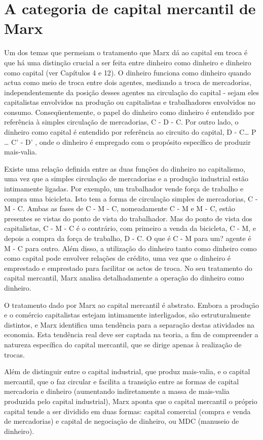 \section{A categoria de capital mercantil de Marx}
 \par 
Um dos temas que permeiam o tratamento que Marx dá ao capital em troca é que há uma distinção crucial a ser feita entre dinheiro como dinheiro e dinheiro como capital (ver Capítulos {\color{blue}4} e {\color{blue}12}). O dinheiro funciona como dinheiro quando actua como meio de troca entre dois agentes, mediando a troca de mercadorias, independentemente da posição desses agentes na circulação do capital - sejam eles capitalistas envolvidos na produção ou capitalistas e trabalhadores envolvidos no consumo. Conseqüentemente, o papel do dinheiro como dinheiro é entendido por referência à simples circulação de mercadorias, C - D - C. Por outro lado, o dinheiro como capital é entendido por referência ao circuito do capital, D - C… P … C' - D' , onde o dinheiro é empregado com o propósito específico de produzir mais-valia.
 \par 
Existe uma relação definida entre as duas funções do dinheiro no capitalismo, uma vez que a simples circulação de mercadorias e a produção industrial estão intimamente ligadas. Por exemplo, um trabalhador vende força de trabalho e compra uma bicicleta. Isto tem a forma de circulação simples de mercadorias, C - M - C. Ambas as fases de C - M - C, nomeadamente C - M e M - C, estão presentes se vistas do ponto de vista do trabalhador. Mas do ponto de vista dos capitalistas, C - M - C é o contrário, com primeiro a venda da bicicleta, C - M, e depois a compra da força de trabalho, D - C. O que é C - M para um? agente é M - C para outro. Além disso, a utilização do dinheiro tanto como dinheiro como como capital pode envolver relações de crédito, uma vez que o dinheiro é emprestado e emprestado para facilitar os actos de troca. No seu tratamento do capital mercantil, Marx analisa detalhadamente a operação do dinheiro como dinheiro.
 \par 
O tratamento dado por Marx ao capital mercantil é abstrato. Embora a produção e o comércio capitalistas estejam intimamente interligados, são estruturalmente distintos, e Marx identifica uma tendência para a separação destas atividades na economia. Esta tendência real deve ser captada na teoria, a fim de compreender a natureza específica do capital mercantil, que se dirige apenas à realização de trocas.
 \par 
Além de distinguir entre o capital industrial, que produz mais-valia, e o capital mercantil, que o faz circular e facilita a transição entre as formas de capital mercadoria e dinheiro (aumentando indiretamente a massa de mais-valia produzida pelo capital industrial), Marx aponta que o capital mercantil o próprio capital tende a ser dividido em duas formas: capital comercial (compra e venda de mercadorias) e capital de negociação de dinheiro, ou MDC (manuseio de dinheiro).

